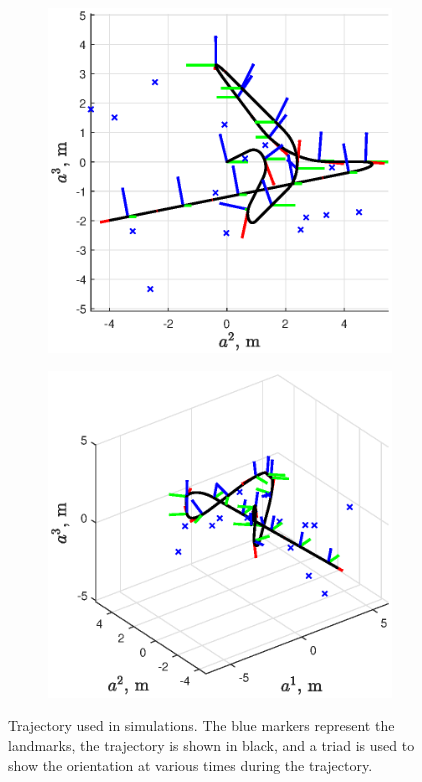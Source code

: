 \begin{figure}
\begin{subfigure}[b]{0.495\textwidth}
            \centering 
            \includegraphics[width=\textwidth]{figs/traj_yz.eps}  
        \end{subfigure}
        \hfill
        \begin{subfigure}[b]{0.495\textwidth}   
            \centering 
            \includegraphics[width=\textwidth]{figs/traj.eps} 
        \end{subfigure} 
	\caption[Trajectory used in simulations.]{Trajectory used in simulations. The blue markers represent the landmarks, the trajectory is shown in black, and a triad is used to show the orientation at various times during the trajectory.}
	\label{fig:se3_traj}
\end{figure}


